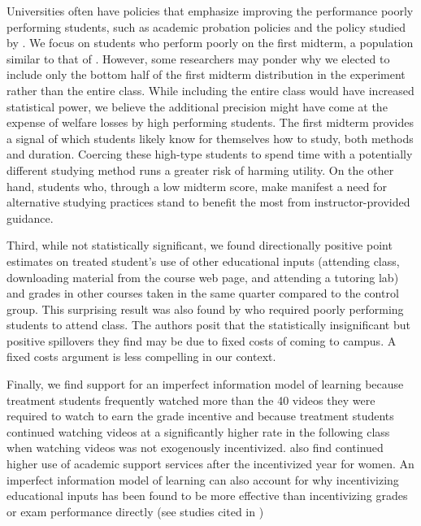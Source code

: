 \documentclass[12pt]{article}
\begin{document}
Universities often have policies that emphasize improving the performance poorly performing students, such as academic probation policies and the policy studied by \textcite{kow2020}. We focus on students who perform poorly on the first midterm, a population similar to that of \textcite{dgm2010}. However, some researchers may ponder why we elected to include only the bottom half of the first midterm distribution in the experiment rather than the entire class. While including the entire class would have increased statistical power, we believe the additional precision might have come at the expense of welfare losses by high performing students. The first midterm provides a signal of which students likely know for themselves how to study, both methods and duration. Coercing these high-type students to spend time with a potentially different studying method runs a greater risk of harming utility. On the other hand, students who, through a low midterm score, make manifest a need for alternative studying practices stand to benefit the most from instructor-provided guidance.

Third, while not statistically significant, we found directionally positive point estimates on treated student's use of other educational inputs (attending class, downloading material from the course web page, and attending a tutoring lab) and grades in other courses taken in the same quarter compared to the control group. This surprising result was also found by \textcite{dgm2010} who required poorly performing students to attend class. The authors posit that the statistically insignificant but positive spillovers they find may be due to fixed costs of coming to campus. A fixed costs argument is less compelling in our context.

Finally, we find support for an imperfect information model of learning because treatment students frequently watched more than the 40 videos they were required to watch to earn the grade incentive and because treatment students continued watching videos at a significantly higher rate in the following class when watching videos was not exogenously incentivized. \textcite{alo2009} also find continued higher use of academic support services after the incentivized year for women. An imperfect information model of learning can also account for why incentivizing educational inputs has been found to be more effective than incentivizing grades or exam performance directly (see studies cited in \textcite{gmr2011})
\end{document}
